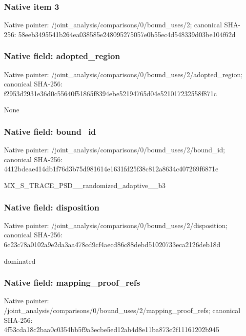 \documentclass[10pt,a4paper]{article}
\begin{document}
\subsubsection{Native item 3}
Native pointer: /joint\_\allowbreak{}analysis/comparisons/0/bound\_\allowbreak{}uses/2; canonical SHA-256: 58eeb3495541b264ea038585e248095275057e0b55ec4d548339d03be104f62d

\subsubsection{Native field: adopted\_\allowbreak{}region}
Native pointer: /joint\_\allowbreak{}analysis/comparisons/0/bound\_\allowbreak{}uses/2/adopted\_\allowbreak{}region; canonical SHA-256: f2953d2931e36d0c55640f51865f8394ebe52194765d04e521017232558f871c

\begingroup\raggedright\sloppy None\par\endgroup

\subsubsection{Native field: bound\_\allowbreak{}id}
Native pointer: /joint\_\allowbreak{}analysis/comparisons/0/bound\_\allowbreak{}uses/2/bound\_\allowbreak{}id; canonical SHA-256: 4412bdeae414db1f76d3b75d981614e1631fd25f38c812a8634c407269f6871e

\begingroup\raggedright\sloppy MX\_\allowbreak{}S\_\allowbreak{}TRACE\_\allowbreak{}PSD\_\allowbreak{}\_\allowbreak{}randomized\_\allowbreak{}adaptive\_\allowbreak{}\_\allowbreak{}b3\par\endgroup

\subsubsection{Native field: disposition}
Native pointer: /joint\_\allowbreak{}analysis/comparisons/0/bound\_\allowbreak{}uses/2/disposition; canonical SHA-256: 6c23c78a0102a9e2da3aa478cd9cf4aecd86c88debd51020733eca2126deb18d

\begingroup\raggedright\sloppy dominated\par\endgroup

\subsubsection{Native field: mapping\_\allowbreak{}proof\_\allowbreak{}refs}
Native pointer: /joint\_\allowbreak{}analysis/comparisons/0/bound\_\allowbreak{}uses/2/mapping\_\allowbreak{}proof\_\allowbreak{}refs; canonical SHA-256: 4f53cda18c2baa0c0354bb5f9a3ecbe5ed12ab4d8e11ba873c2f11161202b945
\end{document}
